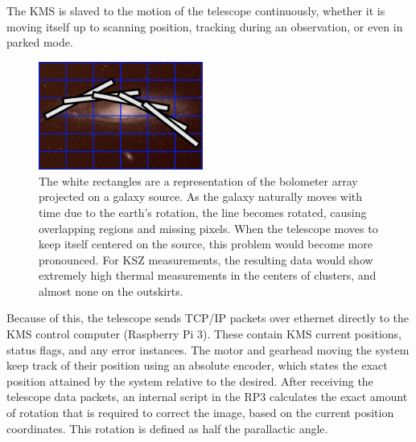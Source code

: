 \documentclass[manuscript]{aastex}
\begin{document}
The KMS is slaved to the motion of the telescope continuously, whether it is moving itself up to scanning position, tracking during an observation, or even in parked mode. \begin{figure}
\vspace{-0.8cm}
  \begin{center}
    \includegraphics[width=0.48\textwidth]{km1.png}
  \end{center}
  \caption[Diagram of Bolometer De-rotation on Source from Alt-Az Mount.]{The white rectangles are a representation of the bolometer array projected on a galaxy source. As the galaxy naturally moves with time due to the earth's rotation, the line becomes rotated, causing overlapping regions and missing pixels. When the telescope moves to keep itself centered on the source, this problem would become more pronounced. For KSZ measurements, the resulting data would show extremely high thermal measurements in the centers of clusters, and almost none on the outskirts.}
  \label{fig:km1}
\end{figure}
Because of this, the telescope sends TCP/IP packets over ethernet directly to the KMS control computer ({\sc Raspberry Pi 3}). These contain KMS current positions, status flags, and any error instances. The motor and gearhead moving the system keep track of their position using an absolute encoder, which states the exact position attained by the system relative to the desired. After receiving the telescope data packets, an internal script in the RP3 calculates the exact amount of rotation that is required to correct the image, based on the current position coordinates. This rotation is defined as half the parallactic angle.
\end{document}
